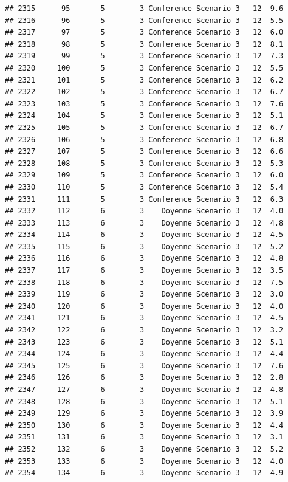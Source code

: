\documentclass[
]{article}
\begin{document}
\begin{verbatim}
## 2315      95       5        3 Conference Scenario 3   12  9.6
## 2316      96       5        3 Conference Scenario 3   12  5.5
## 2317      97       5        3 Conference Scenario 3   12  6.0
## 2318      98       5        3 Conference Scenario 3   12  8.1
## 2319      99       5        3 Conference Scenario 3   12  7.3
## 2320     100       5        3 Conference Scenario 3   12  5.5
## 2321     101       5        3 Conference Scenario 3   12  6.2
## 2322     102       5        3 Conference Scenario 3   12  6.7
## 2323     103       5        3 Conference Scenario 3   12  7.6
## 2324     104       5        3 Conference Scenario 3   12  5.1
## 2325     105       5        3 Conference Scenario 3   12  6.7
## 2326     106       5        3 Conference Scenario 3   12  6.8
## 2327     107       5        3 Conference Scenario 3   12  6.6
## 2328     108       5        3 Conference Scenario 3   12  5.3
## 2329     109       5        3 Conference Scenario 3   12  6.0
## 2330     110       5        3 Conference Scenario 3   12  5.4
## 2331     111       5        3 Conference Scenario 3   12  6.3
## 2332     112       6        3    Doyenne Scenario 3   12  4.0
## 2333     113       6        3    Doyenne Scenario 3   12  4.8
## 2334     114       6        3    Doyenne Scenario 3   12  4.5
## 2335     115       6        3    Doyenne Scenario 3   12  5.2
## 2336     116       6        3    Doyenne Scenario 3   12  4.8
## 2337     117       6        3    Doyenne Scenario 3   12  3.5
## 2338     118       6        3    Doyenne Scenario 3   12  7.5
## 2339     119       6        3    Doyenne Scenario 3   12  3.0
## 2340     120       6        3    Doyenne Scenario 3   12  4.0
## 2341     121       6        3    Doyenne Scenario 3   12  4.5
## 2342     122       6        3    Doyenne Scenario 3   12  3.2
## 2343     123       6        3    Doyenne Scenario 3   12  5.1
## 2344     124       6        3    Doyenne Scenario 3   12  4.4
## 2345     125       6        3    Doyenne Scenario 3   12  7.6
## 2346     126       6        3    Doyenne Scenario 3   12  2.8
## 2347     127       6        3    Doyenne Scenario 3   12  4.8
## 2348     128       6        3    Doyenne Scenario 3   12  5.1
## 2349     129       6        3    Doyenne Scenario 3   12  3.9
## 2350     130       6        3    Doyenne Scenario 3   12  4.4
## 2351     131       6        3    Doyenne Scenario 3   12  3.1
## 2352     132       6        3    Doyenne Scenario 3   12  5.2
## 2353     133       6        3    Doyenne Scenario 3   12  4.0
## 2354     134       6        3    Doyenne Scenario 3   12  4.9

\end{verbatim}
\end{document}

